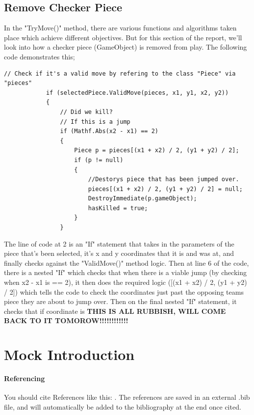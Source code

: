 \documentclass[10pt, a4paper]{article}
\begin{document}
	 \subsection{Remove Checker Piece}
	 In the "TryMove()" method, there are various functions and algorithms taken place which achieve different objectives. But for this section of the report, we'll look into how a checker piece (GameObject) is removed from play. The following code demonstrates this;
	 \begin{lstlisting}[caption = TryMove()]
	 // Check if it's a valid move by refering to the class "Piece" via "pieces"
            if (selectedPiece.ValidMove(pieces, x1, y1, x2, y2))
            {
                // Did we kill?
                // If this is a jump
                if (Mathf.Abs(x2 - x1) == 2)
                {
                    Piece p = pieces[(x1 + x2) / 2, (y1 + y2) / 2];
                    if (p != null)
                    {
                        //Destorys piece that has been jumped over.
                        pieces[(x1 + x2) / 2, (y1 + y2) / 2] = null;
                        DestroyImmediate(p.gameObject);
                        hasKilled = true;
                    }
                }
	 \end{lstlisting}
	 The line of code at 2 is an "If" statement that takes in the parameters of the piece that's been selected, it's x and y coordinates that it is and was at, and finally checks against the "ValidMove()" method logic. Then at line 6 of the code, there is a nested "If" which checks that when there is a viable jump (by checking when x2 - x1 is == 2), it then does the required logic ([(x1 + x2) / 2, (y1 + y2) / 2]) which tells the code to check the coordinates just past the opposing teams piece they are about to jump over. Then on the final nested "If" statement, it checks that if coordinate is \textbf{THIS IS ALL RUBBISH, WILL COME BACK TO IT TOMOROW!!!!!!!!!!!!}
	 
	 
	 
	 
	
	
    \section{Mock Introduction}
    \paragraph{Referencing}
    You should cite References like this: \cite{Keshav}. The references are saved in an external .bib file, and will automatically be added to the bibliography at the end once cited.
    
\end{document}

